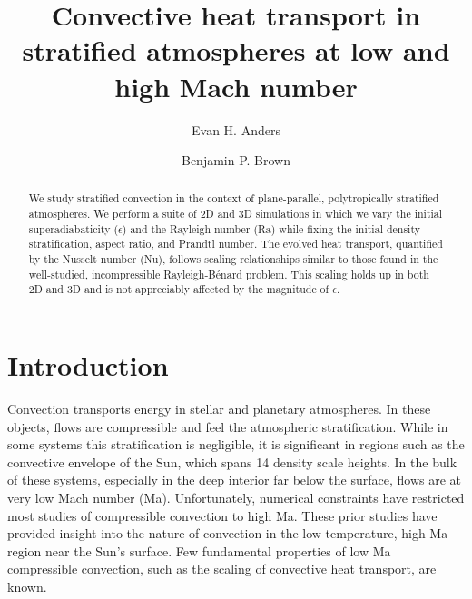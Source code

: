 \documentclass[aps, prl, twocolumn, nofootinbib, groupedaddress, amsfonts, amssymb, amsmath]{revtex4-1}
\begin{document}
\author{Evan H. Anders}
\author{Benjamin P. Brown}
\title{Convective heat transport in stratified atmospheres at low and high Mach number}

\begin{abstract}
We study stratified convection in the context of 
plane-parallel, polytropically stratified atmospheres. 
We perform a suite of 2D and 3D simulations in which we vary the initial
superadiabaticity ($\epsilon$) and the Rayleigh number (Ra) while fixing the
initial density stratification, aspect
ratio, and Prandtl number.
The evolved heat transport, 
quantified by the Nusselt number (Nu),
follows scaling relationships similar to those found in the well-studied, 
incompressible Rayleigh-B\'{e}nard problem.  This scaling holds up in both 2D and 3D and is not
appreciably affected by the magnitude of $\epsilon$. %
\end{abstract}
\maketitle


\section{Introduction}
\label{sec:intro}
Convection transports energy in stellar and planetary atmospheres.
In these objects, flows are compressible and
feel the atmospheric stratification.  While in some systems this stratification 
is negligible, it is significant in regions such as
the convective envelope of the Sun, which spans 14 density scale heights.
In the bulk of these systems, especially in the deep interior far below the surface,
flows are at very low Mach number (Ma).  Unfortunately,
numerical constraints have restricted most studies of 
compressible convection to high Ma.
These prior studies \cite{graham1975, chan&all1982,
hurlburt&all1984, cattaneo&all1990, brummell&all1996,
brandenburg&all2005} have provided insight into the nature of
convection in the low temperature,
high Ma region near the Sun's surface. Few fundamental
properties of low Ma compressible convection, such as the scaling of
convective heat transport, are known.
\end{document}
